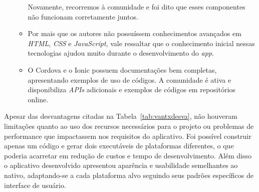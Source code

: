 \begin{itemize}
\begin{itemize}
		Novamente, recorremos à comunidade e foi dito que esses componentes não funcionam corretamente juntos.
		\item Por mais que os autores não possuíssem conhecimentos avançados em \textit{HTML}, \textit{CSS} e \textit{JavaScript}, vale ressaltar que o conhecimento inicial nessas tecnologias ajudou muito 
		durante o desenvolvimento do \textit{app}.
		\item O Cordova e o Ionic possuem documentações bem completas, apresentando exemplos de uso de códigos. A comunidade é ativa e disponibiliza \textit{APIs} adicionais e exemplos de códigos em repositórios online.
	\end{itemize}
 \end{itemize} 

Apesar das desvantagens citadas na Tabela~\ref{tab:vantxdesva}, não houveram limitações quanto ao uso dos recursos necessários para o projeto 
ou problemas de performance que impactassem nos requisitos do aplicativo.
Foi possível construir apenas um código e gerar dois executáveis de plataformas diferentes, o que poderia acarretar em redução de custos e tempo de desenvolvimento.
Além disso o aplicativo desenvolvido apresentou aparência e usabilidade semelhantes ao nativo, adaptando-se a cada plataforma alvo seguindo seus padrões específicos de interface de usuário.